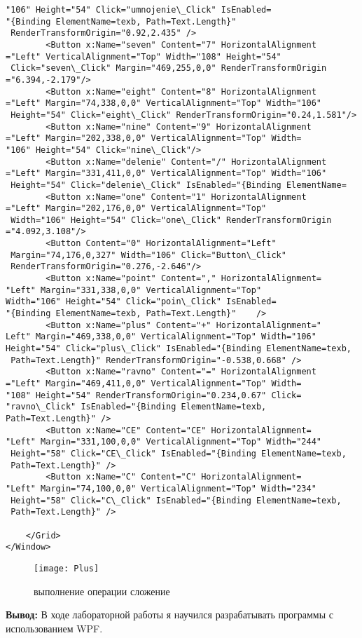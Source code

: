 \begin{verbatim}
"106" Height="54" Click="umnojenie\_Click" IsEnabled=
"{Binding ElementName=texb, Path=Text.Length}"
 RenderTransformOrigin="0.92,2.435" />
        <Button x:Name="seven" Content="7" HorizontalAlignment
="Left" VerticalAlignment="Top" Width="108" Height="54"
 Click="seven\_Click" Margin="469,255,0,0" RenderTransformOrigin
="6.394,-2.179"/>
        <Button x:Name="eight" Content="8" HorizontalAlignment
="Left" Margin="74,338,0,0" VerticalAlignment="Top" Width="106"
 Height="54" Click="eight\_Click" RenderTransformOrigin="0.24,1.581"/>
        <Button x:Name="nine" Content="9" HorizontalAlignment
="Left" Margin="202,338,0,0" VerticalAlignment="Top" Width=
"106" Height="54" Click="nine\_Click"/>
        <Button x:Name="delenie" Content="/" HorizontalAlignment
="Left" Margin="331,411,0,0" VerticalAlignment="Top" Width="106"
 Height="54" Click="delenie\_Click" IsEnabled="{Binding ElementName=
        <Button x:Name="one" Content="1" HorizontalAlignment
="Left" Margin="202,176,0,0" VerticalAlignment="Top"
 Width="106" Height="54" Click="one\_Click" RenderTransformOrigin
="4.092,3.108"/>
        <Button Content="0" HorizontalAlignment="Left"
 Margin="74,176,0,327" Width="106" Click="Button\_Click"
 RenderTransformOrigin="0.276,-2.646"/>
        <Button x:Name="point" Content="," HorizontalAlignment=
"Left" Margin="331,338,0,0" VerticalAlignment="Top" 
Width="106" Height="54" Click="poin\_Click" IsEnabled=
"{Binding ElementName=texb, Path=Text.Length}"    />
        <Button x:Name="plus" Content="+" HorizontalAlignment="
Left" Margin="469,338,0,0" VerticalAlignment="Top" Width="106" 
Height="54" Click="plus\_Click" IsEnabled="{Binding ElementName=texb,
 Path=Text.Length}" RenderTransformOrigin="-0.538,0.668" />
        <Button x:Name="ravno" Content="=" HorizontalAlignment
="Left" Margin="469,411,0,0" VerticalAlignment="Top" Width=
"108" Height="54" RenderTransformOrigin="0.234,0.67" Click=
"ravno\_Click" IsEnabled="{Binding ElementName=texb, 
Path=Text.Length}" />
        <Button x:Name="CE" Content="CE" HorizontalAlignment=
"Left" Margin="331,100,0,0" VerticalAlignment="Top" Width="244"
 Height="58" Click="CE\_Click" IsEnabled="{Binding ElementName=texb,
 Path=Text.Length}" />
        <Button x:Name="C" Content="C" HorizontalAlignment=
"Left" Margin="74,100,0,0" VerticalAlignment="Top" Width="234"
 Height="58" Click="C\_Click" IsEnabled="{Binding ElementName=texb,
 Path=Text.Length}" />

    </Grid>
</Window>
\end{verbatim}





\begin{figure}[h]%
\centering
\texttt{[image: Plus]}
\caption{выполнение операции сложение}
\label{fig:Plus}
\end{figure}




\newpage
\textbf{Вывод:}
В ходе лабораторной работы я научился разрабатывать программы  с использованием WPF.




